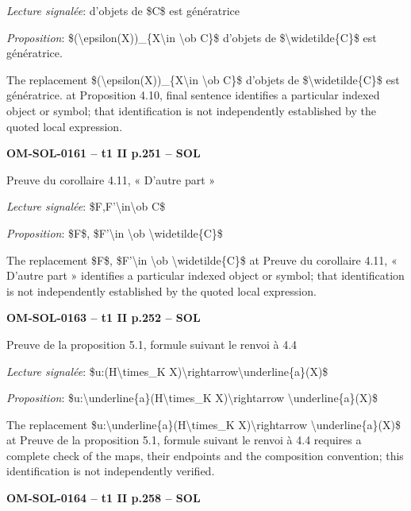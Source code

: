 \emph{Lecture signalée}: d'objets de \$C\$ est génératrice\par
\emph{Proposition}: \$(\textbackslash{}epsilon(X))\_\{X\textbackslash{}in \textbackslash{}ob C\}\$ d'objets de \$\textbackslash{}widetilde\{C\}\$ est génératrice.\par
The replacement \$(\textbackslash{}epsilon(X))\_\{X\textbackslash{}in \textbackslash{}ob C\}\$ d'objets de \$\textbackslash{}widetilde\{C\}\$ est génératrice. at Proposition 4.10, final sentence identifies a particular indexed object or symbol; that identification is not independently established by the quoted local expression.\par
\par\noindent\textbf{OM-SOL-0161 -- t1 II p.251 -- SOL}\par
Preuve du corollaire 4.11, « D'autre part »\par
\emph{Lecture signalée}: \$F,F'\textbackslash{}in\textbackslash{}ob C\$\par
\emph{Proposition}: \$F\$, \$F'\textbackslash{}in \textbackslash{}ob \textbackslash{}widetilde\{C\}\$\par
The replacement \$F\$, \$F'\textbackslash{}in \textbackslash{}ob \textbackslash{}widetilde\{C\}\$ at Preuve du corollaire 4.11, « D'autre part » identifies a particular indexed object or symbol; that identification is not independently established by the quoted local expression.\par
\par\noindent\textbf{OM-SOL-0163 -- t1 II p.252 -- SOL}\par
Preuve de la proposition 5.1, formule suivant le renvoi à 4.4\par
\emph{Lecture signalée}: \$u:(H\textbackslash{}times\_K X)\textbackslash{}rightarrow\textbackslash{}underline\{a\}(X)\$\par
\emph{Proposition}: \$u:\textbackslash{}underline\{a\}(H\textbackslash{}times\_K X)\textbackslash{}rightarrow \textbackslash{}underline\{a\}(X)\$\par
The replacement \$u:\textbackslash{}underline\{a\}(H\textbackslash{}times\_K X)\textbackslash{}rightarrow \textbackslash{}underline\{a\}(X)\$ at Preuve de la proposition 5.1, formule suivant le renvoi à 4.4 requires a complete check of the maps, their endpoints and the composition convention; this identification is not independently verified.\par
\par\noindent\textbf{OM-SOL-0164 -- t1 II p.258 -- SOL}\par
